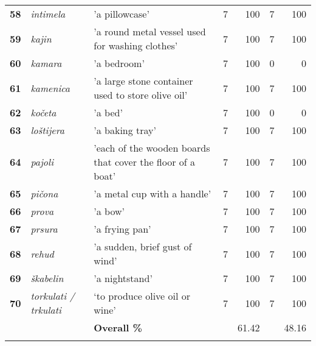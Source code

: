 \documentclass[output=paper]{LSP/langsci}
\begin{document}
\begin{table}
{\begin{tabular}{lp{}p{}lrlr}
{\bfseries 58} & {\itshape intimela} & 'a pillowcase' & 7 & 100 & 7 & 100\\

{\bfseries 59} & {\itshape kajin} & 'a round metal vessel used for washing clothes' & 7 & 100 & 7 & 100\\

{\bfseries 60} & {\itshape kamara} & 'a bedroom' & 7 & 100 & 0 & 0\\

{\bfseries 61} & {\itshape kamenica} & 'a large stone container used to store olive oil' & 7 & 100 & 7 & 100\\

{\bfseries 62} & {\itshape kočeta} & 'a bed' & 7 & 100 & 0 & 0\\

{\bfseries 63} & {\itshape loštijera} & 'a baking tray' & 7 & 100 & 7 & 100\\

{\bfseries 64} & {\itshape pajoli} & 'each of the wooden boards that cover the floor of a boat' & 7 & 100 & 7 & 100\\

{\bfseries 65} & {\itshape pičona} & 'a metal cup with a handle' & 7 & 100 & 7 & 100\\

{\bfseries 66} & {\itshape prova} & 'a bow' & 7 & 100 & 7 & 100\\

{\bfseries 67} & {\itshape prsura} & 'a frying pan' & 7 & 100 & 7 & 100\\

{\bfseries 68} & {\itshape rehud} & 'a sudden, brief gust of wind' & 7 & 100 & 7 & 100\\

{\bfseries 69} & {\itshape škabelin} & 'a nightstand' & 7 & 100 & 7 & 100\\

{\bfseries 70} & {\itshape torkulati / trkulati} & ‘to produce olive oil or wine’ & 7 & 100 & 7 & 100\\

\midrule
& & \bfseries Overall \% & & 61.42 & & 48.16\\

\lspbottomrule
\end{tabular}
}
\end{table}
\end{document}
